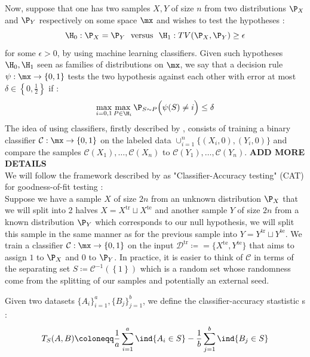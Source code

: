 \noindent
Now, suppose that one has two samples $X,Y$ of size $n$ from two distributions $\P_X$ and $\P_Y$ respectively on some space $\mx$ and wishes to test the hypotheses : 
\begin{equation*}
    \H_0 : \P_X = \P_Y \ \text{ versus } \ \H_1 : TV(\P_X,\P_Y) \geq \epsilon
\end{equation*}
for some $\epsilon > 0$, by using machine learning classifiers. Given such hypotheses $\H_0,\H_1$ seen as families of distributions on $\mx$, we say that a decision rule $\psi : \mx \rightarrow \left\{0,1\right\}$ tests the two hypothesis against each other with error at most $\delta \in \left\{0,\frac{1}{2}\right\}$ if : 
\begin{equation*}
    \max_{i=0,1}\max_{P\in \H_i} \P_{S\sim P}\Bigl(\psi(S)\neq i\Bigr) \leq \delta
\end{equation*}
The idea of using classifiers, firstly described by \citet{friedmanCAT}, consists of training a binary classifier $\mathcal{C}:\mx \rightarrow \left\{0,1\right\}$ on the labeled data $\cup_{i=1}^n \bigl\{\left(X_i,0\right),\left(Y_i,0\right)\bigr\}$ and compare the samples $\mathcal{C}(X_1),\dots,\mathcal{C}(X_n)$ to $\mathcal{C}(Y_1),\dots,\mathcal{C}(Y_n)$. \textbf{ADD MORE DETAILS} \\
We will follow the framework described by \citet{gerberclas} as "Classifier-Accuracy testing" (CAT) for goodness-of-fit testing : \\
\indent Suppose we have a sample $X$ of size $2n$ from an unknown distribution $\P_X$ that we will split into 2 halves $X = X^\text{tr} \sqcup X^\text{te}$ and another sample $Y$ of size $2n$ from a known distribution $\P_Y$ which corresponds to our null hypothesis, we will split this sample in the same manner as for the previous sample into $Y = Y^\text{tr}\sqcup Y^\text{te}$. We train a classifier $\mathcal{C}:\mx \rightarrow \left\{0,1\right\}$ on the input $\mathcal{D}^\text{tr} \coloneqq = \bigl\{X^\text{te},Y^\text{te}\bigr\}$
that aims to assign $1$ to $\P_X$ and $0$ to $\P_Y$. In practice, it is easier to think of $\mathcal{C}$ in terms of the separating set $S \coloneqq \mathcal{C}^{-1}(\left\{1\right\})$ which is a random set whose randomness come from the splitting of our samples and potentially an external seed. \\

\begin{definition}
    Given two datasets $\bigl\{A_i\bigr\}_{i=1}^a,\bigl\{B_j\bigr\}_{j=1}^b$, we define the classifier-accuracy stastistic s : 
    \begin{equation*}
        T_S(A,B) \coloneqq \frac{1}{a}\sum_{i=1}^a \ind{A_i \in S} - \frac{1}{b}\sum_{j=1}^{b} \ind{B_j \in S}
    \end{equation*}
\end{definition}

